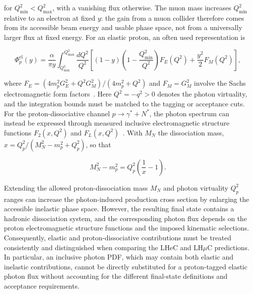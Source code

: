 \documentclass[11pt,a4paper]{article}
\newcommand{\eel}{\mathrm{el}}
\begin{document}
for $Q_{\min}^2<Q_{\max}^2$, with a vanishing flux otherwise. The muon mass 
increases $Q_{\min}^2$ relative to an electron at fixed $y$: the gain from a 
muon collider therefore comes from its accessible beam energy and usable phase space, 
not from a universally larger flux at fixed energy.
For an elastic proton, an often used representation is

\begin{equation}
\Phi_p^{\eel}(y)=\frac{\alpha}{\pi y}\int_{Q_{\min}^2}^{Q_{\max}^2}\frac{dQ^2}{Q^2}\left[(1-y)\left(1-\frac{Q_{\min}^2}{Q^2}\right)F_E(Q^2)+\frac{y^2}{2}F_M(Q^2)\right],
\label{eq:proton}
\end{equation}

where $F_E=(4m_p^2G_E^2+Q^2G_M^2)/(4m_p^2+Q^2)$ and $F_M=G_M^2$ involve the Sachs 
electromagnetic form factors~\cite{Drees1989}. Here $Q^2=-q^2>0$ denotes the photon 
virtuality, and the integration bounds must be matched to the tagging or acceptance cuts. 
For the proton-dissociative channel $p\to\gamma^*+N^*$, the photon spectrum can instead 
be expressed through measured inclusive electromagnetic structure 
functions $F_2(x,Q^2)$ and $F_L(x,Q^2)$~\cite{Manohar2016,Manohar2017}. With $M_N$ the 
dissociation mass, $x=Q_p^2/(M_N^2-m_p^2+Q_p^2)$, so that

\begin{equation}
M_N^2-m_p^2=Q_p^2\left(\frac{1}{x}-1\right).
\label{eq:mn}
\end{equation}


Extending the allowed proton-dissociation mass $M_N$ and photon
virtuality $Q_p^2$ ranges can increase the photon-induced
production cross section by enlarging the accessible inelastic
phase space. However, the resulting final state contains a
hadronic dissociation system, and the corresponding photon
flux depends on the proton electromagnetic structure functions
and the imposed kinematic selections. Consequently, elastic
and proton-dissociative contributions must be treated
consistently and distinguished when comparing the LHeC and
LH$\mu$C predictions. In particular, an inclusive photon PDF,
which may contain both elastic and inelastic contributions,
cannot be directly substituted for a proton-tagged elastic
photon flux without accounting for the different final-state
definitions and acceptance requirements.
\end{document}
